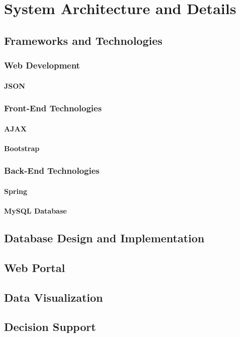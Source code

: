 \chapter{System Architecture and Details}
\label{ChapterFive}
\section{Frameworks and Technologies}
\label{FrameworksAndTechnologies}
\subsection{Web Development}
\subsubsection{JSON}
\subsection{Front-End Technologies}
\subsubsection{AJAX}
\subsubsection{Bootstrap}
\subsection{Back-End Technologies}
\subsubsection{Spring}
\subsubsection{MySQL Database}
\section{Database Design and Implementation}
\label{DatabaseDesignandImplementation}

\section{Web Portal}
\label{WebPrtal}

\section{Data Visualization}
\label{DataVisualization}

\section{Decision Support}
\label{DecisionSuport}